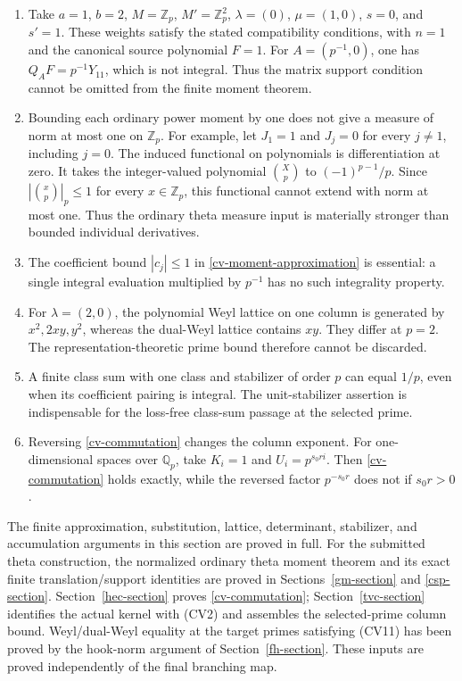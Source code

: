 \begin{enumerate}
\item Take $a=1$, $b=2$, $M=\mathbb Z_p$, $M'=\mathbb Z_p^2$,
$\lambda=(0)$, $\mu=(1,0)$, $s=0$, and $s'=1$.
These weights satisfy the stated compatibility conditions, with
$n=1$ and the canonical source polynomial $F=1$.
For $A=(p^{-1},0)$, one has
$Q_AF=p^{-1}Y_{11}$, which is not integral.  Thus the matrix
support condition cannot be omitted from the finite moment theorem.
\item Bounding each ordinary power moment by one does not give a
measure of norm at most one on $\mathbb Z_p$.  For example, let
$J_1=1$ and $J_j=0$ for every $j\ne1$, including $j=0$.
The induced functional on polynomials is differentiation at zero.
It takes the integer-valued polynomial $\binom Xp$ to
$(-1)^{p-1}/p$.  Since $|\binom xp|_p\le1$ for every
$x\in\mathbb Z_p$, this functional cannot extend with norm at
most one.  Thus the ordinary theta measure input is materially
stronger than bounded individual derivatives.
\item The coefficient bound $|c_j|\le1$ in
\eqref{cv-moment-approximation} is essential: a single integral
evaluation multiplied by $p^{-1}$ has no such integrality property.
\item For $\lambda=(2,0)$, the polynomial Weyl lattice on one
column is generated by $x^2,2xy,y^2$, whereas the dual-Weyl lattice
contains $xy$.  They differ at $p=2$.  The representation-theoretic
prime bound therefore cannot be discarded.
\item A finite class sum with one class and stabilizer of order $p$
can equal $1/p$, even when its coefficient pairing is integral.
The unit-stabilizer assertion is indispensable for the loss-free
class-sum passage at the selected prime.
\item Reversing \eqref{cv-commutation} changes the column exponent.
For one-dimensional spaces over $\mathbb Q_p$, take $K_i=1$ and
$U_i=p^{s_0ri}$.  Then \eqref{cv-commutation} holds exactly, while
the reversed factor $p^{-s_0r}$ does not if $s_0r>0$.
\end{enumerate}

The finite approximation, substitution, lattice, determinant,
stabilizer, and accumulation arguments in this section are proved
in full. For the submitted theta construction, the normalized ordinary
theta moment theorem and its exact finite translation/support identities
are proved in Sections~\ref{gm-section} and \ref{csp-section}.
Section~\ref{hec-section} proves \eqref{cv-commutation};
Section~\ref{tvc-section} identifies the actual kernel with (CV2)
and assembles the selected-prime column bound.
Weyl/dual-Weyl equality at the target primes satisfying (CV11) has
been proved by the hook-norm argument of
Section~\ref{fh-section}. These inputs are proved independently
of the final branching map.


